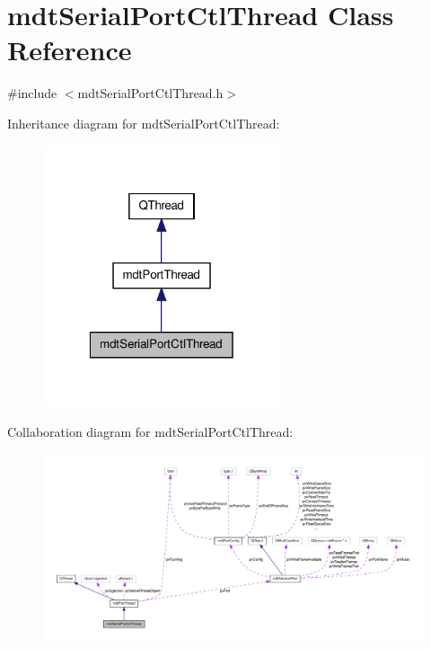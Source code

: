 \hypertarget{classmdt_serial_port_ctl_thread}{\section{mdt\-Serial\-Port\-Ctl\-Thread Class Reference}
\label{classmdt_serial_port_ctl_thread}
}


{\ttfamily \#include $<$mdt\-Serial\-Port\-Ctl\-Thread.\-h$>$}



Inheritance diagram for mdt\-Serial\-Port\-Ctl\-Thread\-:\nopagebreak
\begin{figure}[H]
\begin{center}
\leavevmode
\includegraphics[width=198pt]{classmdt_serial_port_ctl_thread__inherit__graph}
\end{center}
\end{figure}


Collaboration diagram for mdt\-Serial\-Port\-Ctl\-Thread\-:\nopagebreak
\begin{figure}[H]
\begin{center}
\leavevmode
\includegraphics[width=350pt]{classmdt_serial_port_ctl_thread__coll__graph}
\end{center}
\end{figure}
